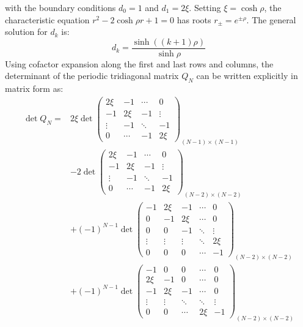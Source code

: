 with the boundary conditions $d_0 = 1$ and $d_1 = 2\xi$. Setting $\xi = \cosh\rho$, the characteristic equation $r^2 - 2\cosh\rho r + 1 = 0$ has roots $r_\pm = e^{\pm\rho}$. The general solution for $d_k$ is:
\begin{equation}
d_k = \frac{\sinh((k+1)\rho)}{\sinh\rho}
\label{eq:recurrence_sol}
\end{equation}
Using cofactor expansion along the first and last rows and columns, the determinant of the periodic tridiagonal matrix $Q_N$ can be written explicitly in matrix form as:
\begin{equation*}
\begin{split}
\det Q_N ={}& 2\xi \det \begin{pmatrix}
  2\xi   & -1     & \cdots & 0 \\
  -1     & 2\xi   & -1     & \vdots \\
  \vdots & -1     & \ddots & -1 \\
  0      & \cdots & -1     & 2\xi
\end{pmatrix}_{(N-1) \times (N-1)} \\
& - 2 \det \begin{pmatrix}
  2\xi   & -1     & \cdots & 0 \\
  -1     & 2\xi   & -1     & \vdots \\
  \vdots & -1     & \ddots & -1 \\
  0      & \cdots & -1     & 2\xi
\end{pmatrix}_{(N-2) \times (N-2)} \\
& + (-1)^{N-1} \det \begin{pmatrix}
  -1     & 2\xi   & -1     & \cdots & 0 \\
  0      & -1     & 2\xi   & \cdots & 0 \\
  0      & 0      & -1     & \ddots & \vdots \\
  \vdots & \vdots & \vdots & \ddots & 2\xi \\
  0      & 0      & 0      & \cdots & -1
\end{pmatrix}_{(N-2) \times (N-2)} \\
& + (-1)^{N-1} \det \begin{pmatrix}
  -1     & 0      & 0      & \cdots & 0 \\
  2\xi   & -1     & 0      & \cdots & 0 \\
  -1     & 2\xi   & -1     & \cdots & 0 \\
  \vdots & \vdots & \ddots & \ddots & \vdots \\
  0      & 0      & \cdots & 2\xi   & -1
\end{pmatrix}_{(N-2) \times (N-2)}
\end{split}
\end{equation*}
